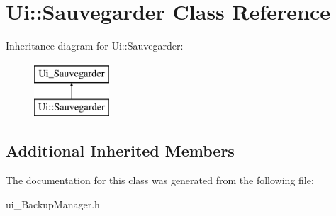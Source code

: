 \hypertarget{class_ui_1_1_sauvegarder}{\section{Ui\-:\-:Sauvegarder Class Reference}
\label{class_ui_1_1_sauvegarder}
}
Inheritance diagram for Ui\-:\-:Sauvegarder\-:\begin{figure}[H]
\begin{center}
\leavevmode
\includegraphics[height=2.000000cm]{class_ui_1_1_sauvegarder}
\end{center}
\end{figure}
\subsection*{Additional Inherited Members}


The documentation for this class was generated from the following file\-:\begin{DoxyCompactItemize}
\item 
ui\-\_\-\-Backup\-Manager.\-h\end{DoxyCompactItemize}
